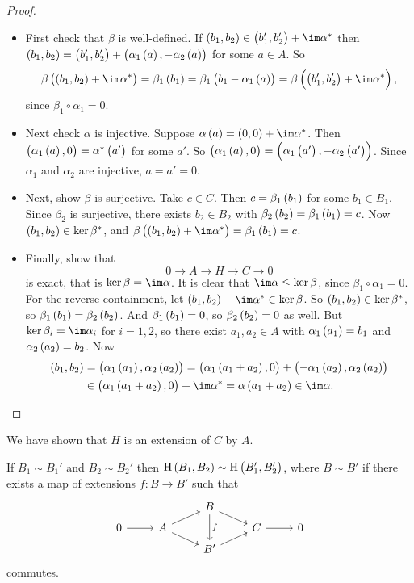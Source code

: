 \begin{proof}
\hfill
\begin{itemize}
\item First check that $ \beta $ is well-defined. If $ \br{b_1, b_2} \in \br{b_1', b_2'} + \im \alpha^* $ then $ \br{b_1, b_2} = \br{b_1', b_2'} + \br{\alpha_1\br{a}, -\alpha_2\br{a}} $ for some $ a \in A $. So
$$ \beta\br{\br{b_1, b_2} + \im \alpha^*} = \beta_1\br{b_1} = \beta_1\br{b_1 - \alpha_1\br{a}} = \beta\br{\br{b_1', b_2'} + \im \alpha^*}, $$
since $ \beta_1 \circ \alpha_1 = 0 $.
\item Next check $ \alpha $ is injective. Suppose $ \alpha\br{a} = \br{0, 0} + \im \alpha^* $. Then $ \br{\alpha_1\br{a}, 0} = \alpha^*\br{a'} $ for some $ a' $. So $ \br{\alpha_1\br{a}, 0} = \br{\alpha_1\br{a'}, -\alpha_2\br{a'}} $. Since $ \alpha_1 $ and $ \alpha_2 $ are injective, $ a = a' = 0 $.
\item Next, show $ \beta $ is surjective. Take $ c \in C $. Then $ c = \beta_1\br{b_1} $ for some $ b_1 \in B_1 $. Since $ \beta_2 $ is surjective, there exists $ b_2 \in B_2 $ with $ \beta_2\br{b_2} = \beta_1\br{b_1} = c $. Now $ \br{b_1, b_2} \in \ker \beta^* $, and $ \beta\br{\br{b_1, b_2} + \im \alpha^*} = \beta_1\br{b_1} = c $.

\pagebreak

\item Finally, show that
$$ 0 \to A \to H \to C \to 0 $$
is exact, that is $ \ker \beta = \im \alpha $. It is clear that $ \im \alpha \le \ker \beta $, since $ \beta_1 \circ \alpha_1 = 0 $. For the reverse containment, let $ \br{b_1, b_2} + \im \alpha^* \in \ker \beta $. So $ \br{b_1, b_2} \in \ker \beta^* $, so $ \beta_1\br{b_1} = \beta_2\br{b_2} $. And $ \beta_1\br{b_1} = 0 $, so $ \beta_2\br{b_2} = 0 $ as well. But $ \ker \beta_i = \im \alpha_i $ for $ i = 1, 2 $, so there exist $ a_1, a_2 \in A $ with $ \alpha_1\br{a_1} = b_1 $ and $ \alpha_2\br{a_2} = b_2 $. Now
\begin{align*}
\br{b_1, b_2}
& = \br{\alpha_1\br{a_1}, \alpha_2\br{a_2}}
= \br{\alpha_1\br{a_1 + a_2}, 0} + \br{-\alpha_1\br{a_2}, \alpha_2\br{a_2}} \\
& \in \br{\alpha_1\br{a_1 + a_2}, 0} + \im \alpha^*
= \alpha\br{a_1 + a_2}
\in \im \alpha.
\end{align*}
\end{itemize}
\end{proof}

We have shown that $ H $ is an extension of $ C $ by $ A $.

\begin{proposition}
If $ B_1 \sim B_1' $ and $ B_2 \sim B_2' $ then $ \H\br{B_1, B_2} \sim \H\br{B_1', B_2'} $, where $ B \sim B' $ if there exists a map of extensions $ f : B \to B' $ such that
$$
\begin{tikzcd}[row sep=tiny]
& & B \arrow{dr} \arrow{dd}{f} & & \\
0 \arrow{r} & A \arrow{ur} \arrow{dr} & & C \arrow{r} & 0 \\
& & B' \arrow{ur} & &
\end{tikzcd}
$$
commutes.
\end{proposition}

